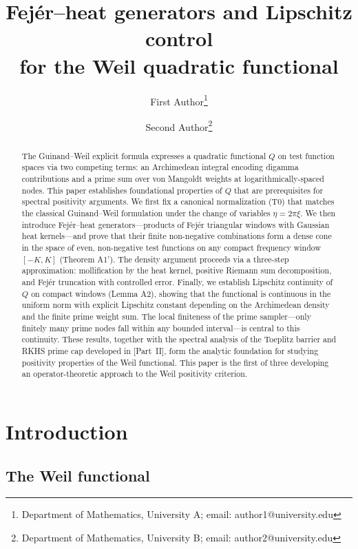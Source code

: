 \documentclass[11pt,a4paper]{article}
\title{Fej\'er--heat generators and Lipschitz control\\for the Weil quadratic functional}
\author{
  {\sc First Author}\thanks{Department of Mathematics, University A; email: author1@university.edu}
  \and
  {\sc Second Author}\thanks{Department of Mathematics, University B; email: author2@university.edu}
}
\date{}
\theoremstyle{definition}
\theoremstyle{remark}
\begin{document}
\maketitle

\begin{abstract}
The Guinand--Weil explicit formula expresses a quadratic functional $Q$ on test function spaces via two competing terms: an Archimedean integral encoding digamma contributions and a prime sum over von Mangoldt weights at logarithmically-spaced nodes. This paper establishes foundational properties of $Q$ that are prerequisites for spectral positivity arguments. We first fix a canonical normalization (T0) that matches the classical Guinand--Weil formulation under the change of variables $\eta = 2\pi\xi$. We then introduce Fej\'er--heat generators---products of Fej\'er triangular windows with Gaussian heat kernels---and prove that their finite non-negative combinations form a dense cone in the space of even, non-negative test functions on any compact frequency window $[-K, K]$ (Theorem A1'). The density argument proceeds via a three-step approximation: mollification by the heat kernel, positive Riemann sum decomposition, and Fej\'er truncation with controlled error. Finally, we establish Lipschitz continuity of $Q$ on compact windows (Lemma A2), showing that the functional is continuous in the uniform norm with explicit Lipschitz constant depending on the Archimedean density and the finite prime weight sum. The local finiteness of the prime sampler---only finitely many prime nodes fall within any bounded interval---is central to this continuity. These results, together with the spectral analysis of the Toeplitz barrier and RKHS prime cap developed in [Part~II], form the analytic foundation for studying positivity properties of the Weil functional. This paper is the first of three developing an operator-theoretic approach to the Weil positivity criterion.
\end{abstract}

\tableofcontents

\section{Introduction}

\subsection{The Weil functional}
\end{document}
